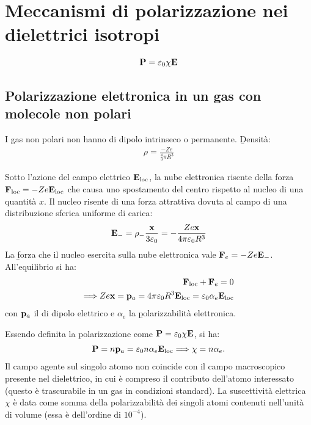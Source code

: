 \section{Meccanismi di polarizzazione nei dielettrici isotropi}%
\begin{equation}\begin{split}
\mathbf{P}=\varepsilon_0\chi\mathbf{E}
\end{split}\end{equation}

\subsection{Polarizzazione elettronica in un gas con molecole non polari}
I gas non polari non hanno \mom di dipolo intrinseco o permanente. \b{Densità}:
\begin{equation}\begin{split}
\rho=\frac{-Ze}{\frac{4}{3}\pi R^3}
\end{split}\end{equation}

Sotto l'azione del campo elettrico $\mathbf{E}_{\textrm{loc}}$, la nube elettronica risente della forza $\mathbf{F}_{\textrm{loc}}=-Ze\mathbf{E}_{\textrm{loc}}$ che causa uno spostamento del centro rispetto al nucleo di una quantità $x$. Il nucleo risente di una forza attrattiva dovuta al campo di una distribuzione sferica uniforme di carica:
\begin{equation}\begin{split}
\mathbf{E}_-=\rho_-\frac{\mathbf{x}}{3\varepsilon_0}=-\frac{Ze\mathbf{x}}{4\pi\varepsilon_0 R^3}
\end{split}\end{equation}
La \b{forza che il nucleo esercita sulla nube elettronica} vale $\mathbf{F}_e=-Ze\mathbf{E}_-$. All'equilibrio si ha:
\begin{equation}\begin{split}
\mathbf{F}_{\textrm{loc}}+\mathbf{F}_e=0\\
\Longrightarrow Ze\mathbf{x}=\mathbf{p}_a=4\pi\varepsilon_0 R^3\mathbf{E}_{\textrm{loc}}=\varepsilon_0\alpha_e\mathbf{E}_{\textrm{loc}}
\end{split}\end{equation}
con $\mathbf{p}_a$ il \mom di dipolo elettrico e $\alpha_e$ la \b{polarizzabilità elettronica}.

Essendo definita la polarizzazione come $\mathbf{P}=\varepsilon_0\chi\mathbf{E}$, si ha:
\begin{equation}\begin{split}
\mathbf{P}=n\mathbf{p}_a=\varepsilon_0n\alpha_e\mathbf{E}_{\textrm{loc}}
\Longrightarrow \chi=n\alpha_e.
\end{split}\end{equation}
Il campo agente sul singolo atomo non coincide con il campo macroscopico \dE presente nel dielettrico, in cui è compreso il contributo dell'atomo interessato (questo è trascurabile in un gas in condizioni standard). La suscettività elettrica $\chi$ è data come somma della polarizzabilità dei singoli atomi contenuti nell'unità di volume (essa è dell'ordine di $10^{-4}$).

